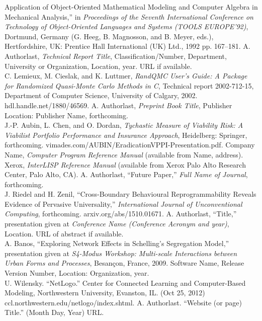 \documentclass{article}
\begin{document}
\begin{thebibliography}{99}
Application of Object-Oriented Mathematical Modeling and Computer
Algebra in Mechanical Analysis,'' in \textit{Proceedings of the
Seventh  International Conference on Technology of Object-Oriented
Languages and Systems (TOOLS EUROPE'92)}, Dortmund, Germany 
(G.  Heeg, B. Magnosson, and B. Meyer, eds.), Hertfordshire, UK: Prentice
Hall International (UK) Ltd., 1992 pp. 167--181.
A. Authorlast, \textit{Technical Report Title}, Classification/Number,
Department, University or Organization, Location, year. URL if
available.\\
C. Lemieux, M. Cieslak, and K. Luttmer, \textit{RandQMC User's
Guide: A Package for Randomized Quasi-Monte Carlo Methods in C},
Technical report 2002-712-15, Department of Computer Science,
University of Calgary, 2002. hdl.handle.net/1880/46569.
A. Authorlast, \textit{Preprint Book Title}, Publisher Location:
Publisher Name, forthcoming. \\
J.-P. Aubin, L. Chen, and O. Dordan, \textit{Tychastic Measure of
Viability Risk: A Viabilist Portfolio Performance and Insurance
Approach}, Heidelberg: Springer, forthcoming. 
vimades.com/AUBIN/EradicationVPPI-Presentation.pdf.
Company Name, \textit{Computer Program Reference Manual} (available from Name, address). \\
Xerox, \textit{InterLISP Reference Manual} (available from Xerox
Palo Alto Research Center, Palo Alto, CA).
A. Authorlast, ``Future Paper,'' \textit{Full Name of Journal}, forthcoming.\\ 
J. Riedel and H. Zenil, ``Cross-Boundary Behavioural Reprogrammability Reveals Evidence of Pervasive Universality,'' \textit{ International Journal of Unconventional Computing}, forthcoming. arxiv.org/abs/1510.01671.
A. Authorlast, ``Title,'' presentation given at \textit{Conference
Name (Conference Acronym and year)}, Location. URL of abstract if
available.\\
A. Banos, ``Exploring Network Effects in Schelling's Segregation
Model,'' presentation given at \textit{S4-Modus Workshop: Multi-scale
Interactions between Urban Forms and Processes}, Besan{\c c}on,
France, 2009.
Software Name, Release Version Number, Location: Organization, year.\\
U. Wilensky. ``NetLogo.'' Center for Connected Learning and
Computer-Based Modeling, Northwestern University, Evanston, IL.
(Oct 25, 2012) ccl.northwestern.edu/netlogo/index.shtml.
A. Authorlast. ``Website (or page) Title.'' (Month Day, Year) URL.\\

\end{thebibliography}
\end{document}
